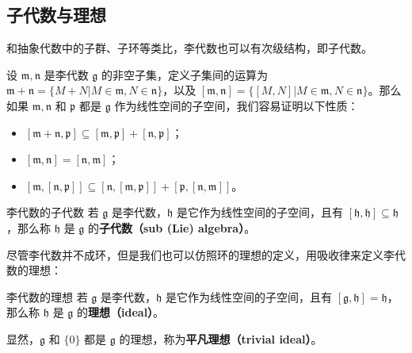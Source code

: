 
\begin{issues}
\end{issues}


\subsection{子代数与理想}
和抽象代数中的子群、子环等类比，李代数也可以有次级结构，即子代数。

设 $\mathfrak{m}, \mathfrak{n}$ 是李代数 $\mathfrak{g}$ 的非空子集，定义子集间的运算为 $\mathfrak{m}+\mathfrak{n}=\{M+N|M\in\mathfrak{m}, N\in\mathfrak{n}\}$，以及 $[\mathfrak{m}, \mathfrak{n}]=\{[M, N]|M\in\mathfrak{m}, N\in\mathfrak{n}\}$。那么如果 $\mathfrak{m}, \mathfrak{n}$ 和 $\mathfrak{p}$ 都是 $\mathfrak{g}$ 作为线性空间的子空间，我们容易证明以下性质：

\begin{itemize}
\item $[\mathfrak{m}+\mathfrak{n}, \mathfrak{p}]\subseteq[\mathfrak{m}, \mathfrak{p}]+[\mathfrak{n}, \mathfrak{p}]$；
\item $[\mathfrak{m},\mathfrak{n}]=[\mathfrak{n}, \mathfrak{m}]$；
\item $[\mathfrak{m}, [\mathfrak{n}, \mathfrak{p}]]\subseteq[\mathfrak{n}, [\mathfrak{m}, \mathfrak{p}]]+[\mathfrak{p}, [\mathfrak{n}, \mathfrak{m}]]$。
\end{itemize}

\begin{definition}{李代数的子代数}
若 $\mathfrak{g}$ 是李代数，$\mathfrak{h}$ 是它作为线性空间的子空间，且有 $[\mathfrak{h}, \mathfrak{h}]\subseteq\mathfrak{h}$，那么称 $\mathfrak{h}$ 是 $\mathfrak{g}$ 的\textbf{子代数（sub (Lie) algebra）}。
\end{definition}


尽管李代数并不成环，但是我们也可以仿照环的理想的定义，用吸收律来定义李代数的理想：

\begin{definition}{李代数的理想}
若 $\mathfrak{g}$ 是李代数，$\mathfrak{h}$ 是它作为线性空间的子空间，且有 $[\mathfrak{g}, \mathfrak{h}]=\mathfrak{h}$，那么称 $\mathfrak{h}$ 是 $\mathfrak{g}$ 的\textbf{理想（ideal）}。

显然，$\mathfrak{g}$ 和 $\{0\}$ 都是 $\mathfrak{g}$ 的理想，称为\textbf{平凡理想（trivial ideal）}。
\end{definition}

